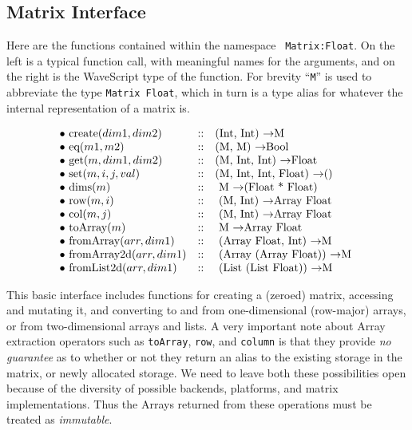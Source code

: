 \documentclass[twocolumn]{report}
\newcommand{\ra}{\ensuremath{\rightarrow}}
\begin{document}
\subsection{Matrix Interface}

Here are the functions contained within the namespace {\tt
  Matrix:Float}.  On the left is a typical function call, with
  meaningful names for the arguments, and on the right is the
  WaveScript type of the function.  For brevity ``{\tt M}'' is used to
  abbreviate the type {\tt Matrix Float}, which in turn is a type
  alias for whatever the internal representation of a matrix is.

\[
\begin{array}{lcl}
\bullet$ $ $create$(dim1,dim2)     & :: &  $(Int, Int)                \ra   M$   \\
\bullet$ $ $eq$(m1, m2)            & :: &  $(M, M)          \ra   Bool$   \\
\bullet$ $ $get$(m, dim1, dim2)    & :: &  $(M, Int, Int)        \ra   Float$   \\
\bullet$ $ $set$(m, i, j, val)     & :: &  $(M, Int, Int, Float) \ra   ()$ \\
\bullet$ $ $dims$(m)               & :: &  $ M                   \ra   (Float * Float)$ \\
\bullet$ $ $row$(m,i)              & :: &  $ (M, Int)            \ra   Array Float$ \\
\bullet$ $ $col$(m,j)              & :: &  $ (M, Int)            \ra   Array Float$ \\
\bullet$ $ $toArray$(m)            & :: &  $ M                   \ra   Array Float $ \\
\bullet$ $ $fromArray$(arr,dim1)   & :: &  $ (Array Float, Int)       \ra   M $ \\
\bullet$ $ $fromArray2d$(arr,dim1) & :: &  $ (Array (Array Float))    \ra   M $ \\
\bullet$ $ $fromList2d$(arr,dim1)  & :: &  $ (List (List Float))    \ra   M $ \\
\end{array}
\]

This basic interface includes functions for creating a (zeroed)
matrix, accessing and mutating it, and converting to and from
one-dimensional (row-major) arrays, or from two-dimensional arrays and
lists.  A very important note about Array extraction operators such as
{\tt toArray}, {\tt row}, and {\tt column} is that they provide {\em
no guarantee} as to whether or not they return an alias to the
existing storage in the matrix, or newly allocated storage.  We need
to leave both these possibilities open because of the diversity of
possible backends, platforms, and matrix implementations.  Thus the
Arrays returned from these operations must be treated as {\em
immutable}.
\end{document}
